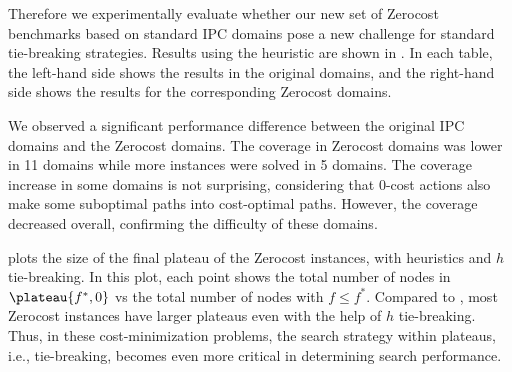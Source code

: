 

Therefore we experimentally evaluate whether our new set of Zerocost benchmarks based on standard IPC domains pose a new challenge for
standard tie-breaking strategies. Results using the \lmcut
heuristic are shown in %
. In each table,
the left-hand side shows the results in the original domains, and the right-hand side
shows the results for the corresponding Zerocost domains.

We observed a significant
performance difference between the original IPC domains and the Zerocost
domains.
The coverage in Zerocost domains
was lower in 11 domains while more instances were solved
in 5 domains.
The coverage increase in some domains is not surprising, considering that 0-cost actions also make some suboptimal paths into cost-optimal paths. However, the coverage decreased overall, confirming the difficulty of these domains.

 plots the size of the final plateau of the
Zerocost instances, with \lmcut heuristics and $h$ tie-breaking. In this plot,
each point shows the total number of nodes in $\plateau{f^*,0}$ vs the
total number of nodes with $f\leq f^*$. Compared to ,
most Zerocost instances have larger plateaus even with the help of
$h$ tie-breaking.  Thus, in these cost-minimization problems, the search
strategy within plateaus, i.e., tie-breaking, becomes even more critical
in determining search performance.

